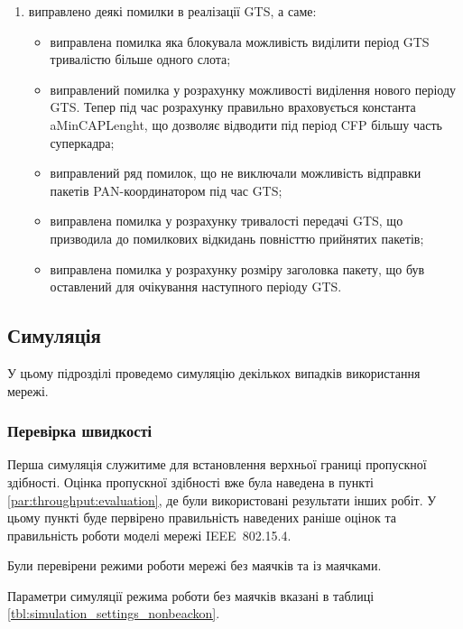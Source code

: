 \documentclass[a4paper,ukrainian,utf8,nocolumnsxix,floatsection,equationsection]{eskdtext}
\renewcommand\paragraph{\subsubsection}
\newcommand{\iee}[0]{IEEE~802.15.4\xspace}
\begin{document}
\begin{enumerate}
	\item виправлено деякі помилки в реалізації GTS, а саме:
	\begin{itemize}
		\item виправлена помилка яка блокувала можливість виділити період GTS тривалістю більше одного слота;
		\item виправлений помилка у розрахунку можливості виділення нового періоду GTS. Тепер під час розрахунку правильно враховується константа aMinCAPLenght, що дозволяє відводити під період CFP більшу часть суперкадра;
		\item виправлений ряд помилок, що не виключали можливість відправки пакетів PAN-координатором під час GTS;
		\item виправлена помилка у розрахунку тривалості передачі GTS, що призводила до помилкових відкидань повністтю прийнятих пакетів;
		\item виправлена помилка у розрахунку розміру заголовка пакету, що був оставлений для очікування наступного періоду GTS.
	\end{itemize}

\end{enumerate}

\subsection{Симуляція}

У цьому підрозділі проведемо симуляцію декількох випадків використання мережі. 

\paragraph{Перевірка швидкості}
\label{par:simulation_speed_test}

Перша симуляція служитиме для встановлення верхньої границі пропускної здібності. Оцінка пропускної здібності вже була наведена в пункті \ref{par:throughput:evaluation}, де були використовані результати інших робіт. У цьому пункті буде первірено правильність наведених раніше оцінок та правильність роботи моделі мережі \iee.

Були перевірени режими роботи мережі без маячків та із маячками.

Параметри симуляції режима роботи без маячків вказані в таблиці \ref{tbl:simulation_settings_nonbeackon}.
\end{document}
